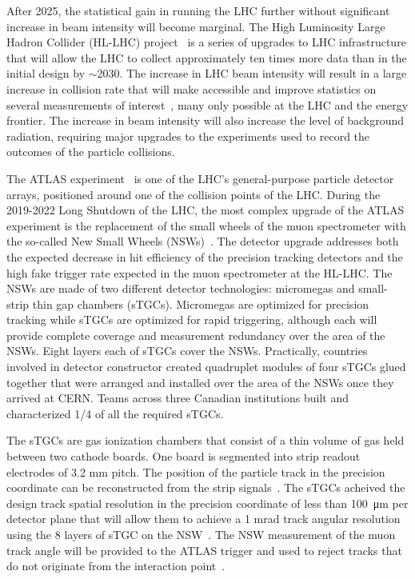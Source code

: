 After 2025, the statistical gain in running the LHC further without significant increase in beam intensity will become marginal. The High Luminosity Large Hadron Collider (HL-LHC) project~\cite{hl_lhc_tdr} is a series of upgrades to LHC infrastructure that will allow the LHC to collect approximately ten times more data than in the initial design by $\sim$2030. The increase in LHC beam intensity will result in a large increase in collision rate that will make accessible and improve statistics on several measurements of interest~\cite{dainese_physics_2018}, many only possible at the LHC and the energy frontier. The increase in beam intensity will also increase the level of background radiation, requiring major upgrades to the experiments used to record the outcomes of the particle collisions.

The ATLAS experiment~\cite{collaboration_atlas_2008} is one of the LHC's general-purpose particle detector arrays, positioned around one of the collision points of the LHC.  During the 2019-2022 Long Shutdown of the LHC, the most complex upgrade of the ATLAS experiment is the replacement of the small wheels of the muon spectrometer with the so-called New Small Wheels (NSWs)~\cite{nsw_tdr}. The detector upgrade addresses both the expected decrease in hit efficiency of the precision tracking detectors and the high fake trigger rate expected in the muon spectrometer at the HL-LHC. The NSWs are made of two different detector technologies: micromegas and small-strip thin gap chambers (sTGCs). Micromegas are optimized for precision tracking while sTGCs are optimized for rapid triggering, although each will provide complete coverage and measurement redundancy over the area of the NSWs. Eight layers each of sTGCs cover the NSWs. Practically, countries involved in detector constructor created quadruplet modules of four sTGCs glued together that were arranged and installed over the area of the NSWs once they arrived at CERN. Teams across three Canadian institutions built and characterized 1/4 of all the required sTGCs.

The sTGCs are gas ionization chambers that consist of a thin volume of gas held between two cathode boards. One board is segmented into strip readout electrodes of 3.2 mm pitch.  The position of the particle track in the precision coordinate can be reconstructed from the strip signals~\cite{nsw_tdr}. The sTGCs acheived the design track spatial resolution in the precision coordinate of less than \SI{100}{\micro\meter} per detector plane that will allow them to achieve a 1 mrad track angular resolution using the 8 layers of sTGC on the NSW~\cite{abusleme_performance_2016, nsw_tdr}. The NSW measurement of the muon track angle will be provided to the  ATLAS trigger and used to reject tracks that do not originate from the interaction point~\cite{nsw_tdr}.

